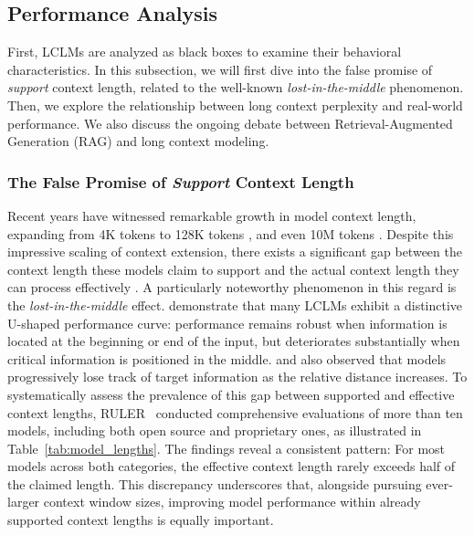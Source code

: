 \documentclass[11pt, a4paper, logo, copyright, nonumbering]{map}
\begin{document}
\subsection{Performance Analysis} 
\label{ssec:blackbox_analysis}

First, LCLMs are analyzed as black boxes to examine their behavioral characteristics. In this subsection, we will first dive into the false promise of \textit{support} context length, related to the well-known \textit{lost-in-the-middle} phenomenon. Then, we explore the relationship between long context perplexity and real-world performance. We also discuss the ongoing debate between Retrieval-Augmented Generation (RAG) and long context modeling.



\subsubsection{The False Promise of \textit{Support} Context Length} 


Recent years have witnessed remarkable growth in model context length, expanding from 4K tokens \citep{touvron2023llama} to 128K tokens \citep{grattafiori2024llama}, and even 10M tokens \citep{team2024gemini}. Despite this impressive scaling of context extension, there exists a significant gap between the context length these models claim to support and the actual context length they can process effectively \citep{liu2024lost,hsieh2024ruler}. A particularly noteworthy phenomenon in this regard is the \textit{lost-in-the-middle} effect. \citet{liu2024lost} demonstrate that many LCLMs exhibit a distinctive U-shaped performance curve: performance remains robust when information is located at the beginning or end of the input, but deteriorates substantially when critical information is positioned in the middle. \citet{an2024make} and \citet{he2023never} also observed that models progressively lose track of target information as the relative distance increases. To systematically assess the prevalence of this gap between supported and effective context lengths, RULER~\citep{hsieh2024ruler} conducted comprehensive evaluations of more than ten models, including both open source and proprietary ones, as illustrated in Table~\ref{tab:model_lengths}. The findings reveal a consistent pattern: For most models across both categories, the effective context length rarely exceeds half of the claimed length. This discrepancy underscores that, alongside pursuing ever-larger context window sizes, improving model performance within already supported context lengths is equally important.
\end{document}
